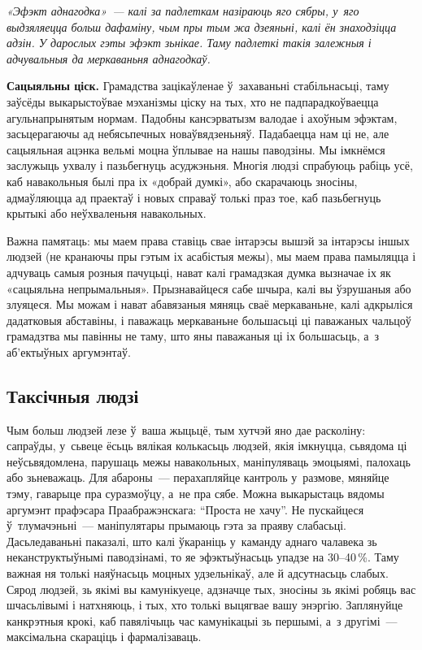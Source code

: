 \emph{«Эфэкт аднагодка»~--- калі за падлеткам назіраюць яго сябры, у~яго выдзяляецца больш дафаміну, чым пры тым жа дзеяньні, калі ён знаходзіцца адзін. У дарослых гэты эфэкт зьнікае. Таму падлеткі такія залежныя і адчувальныя да меркаваньня аднагодкаў.}

\textbf{Сацыяльны ціск.} Грамадства зацікаўленае ў~захаваньні стабільнасьці, таму заўсёды выкарыстоўвае мэханізмы ціску на тых, хто не падпарадкоўваецца агульнапрынятым нормам. Падобны кансэрватызм валодае і ахоўным эфэктам, засьцерагаючы ад небясьпечных новаўвядзеньняў. Падабаецца нам ці не, але сацыяльная ацэнка вельмі моцна ўплывае на нашы паводзіны. Мы імкнёмся заслужыць ухвалу і пазьбегнуць асуджэньня. Многія людзі спрабуюць рабіць усё, каб навакольныя былі пра іх «добрай думкі», або скарачаюць зносіны, адмаўляюцца ад праектаў і новых справаў толькі праз тое, каб пазьбегнуць крытыкі або неўхваленьня навакольных.

Важна памятаць: мы маем права ставіць свае інтарэсы вышэй за інтарэсы іншых людзей (не кранаючы пры гэтым іх асабістыя межы), мы маем права памыляцца і адчуваць самыя розныя пачуцьці, нават калі грамадзкая думка вызначае іх як «сацыяльна непрымальныя». Прызнавайцеся сабе шчыра, калі вы ўзрушаныя або злуяцеся. Мы можам і нават абавязаныя мяняць сваё меркаваньне, калі адкрыліся дадатковыя абставіны, і паважаць меркаваньне большасьці ці паважаных чальцоў грамадзтва мы павінны не таму, што яны паважаныя ці іх большасьць, а~з аб'ектыўных аргумэнтаў.

\subsection*{Таксічныя людзі}

Чым больш людзей лезе ў~ваша жыцьцё, тым хутчэй яно дае расколіну: сапраўды, у~сьвеце ёсьць вялікая колькасьць людзей, якія імкнуцца, сьвядома ці неўсьвядомлена, парушаць межы навакольных, маніпуляваць эмоцыямі, палохаць або зьневажаць. Для абароны~--- перахапляйце кантроль у~размове, мяняйце тэму, гаварыце пра суразмоўцу, а~не пра сябе. Можна выкарыстаць вядомы аргумэнт прафэсара Праабражэнскага: ``Проста не хачу''. Не пускайцеся ў~тлумачэньні~--- маніпулятары прымаюць гэта за праяву слабасьці. Дасьледаваньні паказалі, што калі ўкараніць у~каманду аднаго чалавека зь неканструктыўнымі паводзінамі, то яе эфэктыўнасьць упадзе на 30--40\,\%. Таму важная ня толькі наяўнасьць моцных удзельнікаў, але й адсутнасьць слабых. Сярод людзей, зь якімі вы камунікуеце, адзначце тых, зносіны зь якімі робяць вас шчасьлівымі і натхняюць, і тых, хто толькі выцягвае вашу энэргію. Заплянуйце канкрэтныя крокі, каб павялічыць час камунікацыі зь першымі, а~з другімі~--- максімальна скараціць і фармалізаваць.

